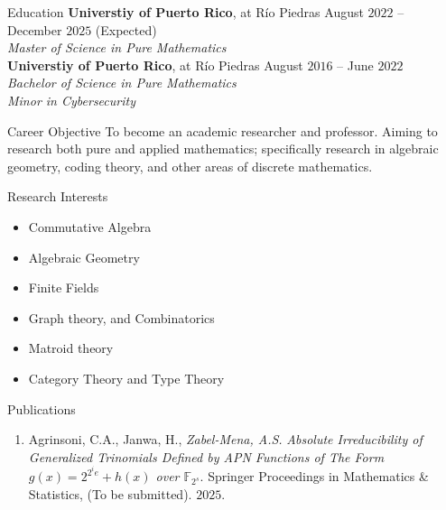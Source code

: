 \documentclass{resume}
\begin{document}
\begin{rSection}{Education}
  \textbf{Universtiy of Puerto Rico}, at R\'io Piedras
  \hfill August $2022$ -- December $2025$ (Expected)  \\
  \textit{Master of Science in Pure Mathematics} \\

  \textbf{Universtiy of Puerto Rico}, at R\'io Piedras
  \hfill August $2016$ -- June $2022$  \\
  \textit{Bachelor of Science in Pure Mathematics}  \\
  \textit{Minor in Cybersecurity}
\end{rSection}

\begin{rSection}{Career Objective}
  To become an academic researcher and professor. Aiming to research both pure
  and applied mathematics; specifically research in algebraic
  geometry, coding theory, and other areas of discrete mathematics.
\end{rSection}

\begin{rSection}{Research Interests}
  \begin{multicols}{2}
    \begin{itemize}
      \item Commutative Algebra

      \item Algebraic Geometry

      \item Finite Fields

      \item Graph theory, and Combinatorics

      \item Matroid theory

      \item Category Theory and Type Theory
    \end{itemize}
  \end{multicols}
\end{rSection}


\begin{rSection}{Publications}
  \begin{enumerate}
    \item Agrinsoni, C.A., Janwa, H., \textit{Zabel-Mena, A.S.}
      \textit{Absolute Irreducibility of Generalized
        Trinomials Defined by APN Functions of The Form
      $g(x)=2^{2^ie}+h(x)$ over $\mathbb{F}_{2^s}$}. Springer
      Proceedings in Mathematics \& Statistics, (To be submitted).
      $2025$.
  \end{enumerate}
\end{rSection}
\end{document}
